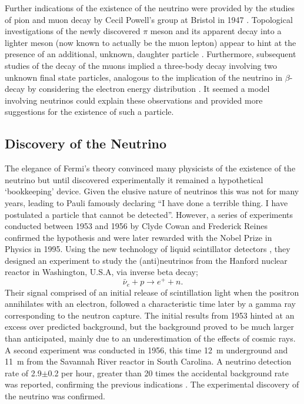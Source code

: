 Further indications of the existence of the neutrino were provided by the studies of pion and muon decay by Cecil Powell's group at Bristol in 1947 \cite{Lattes1947-159,Lattes1947-160}.  Topological investigations of the newly discovered $\pi$ meson and its apparent decay into a lighter meson (now known to actually be the muon lepton) appear to hint at the presence of an additional, unknown, daughter particle \cite{Lattes1947-159}.  Furthermore, subsequent studies of the decay of the muons implied a three-body decay involving two unknown final state particles, analogous to the implication of the neutrino in $\beta$-decay by considering the electron energy distribution \cite{Brown1949}.  It seemed a model involving neutrinos could explain these observations and provided more suggestions for the existence of such a particle.

\subsection{Discovery of the Neutrino}\label{NeutrinoDiscovery}

The elegance of Fermi's theory convinced many physicists of the existence of the neutrino but until discovered experimentally it remained a hypothetical `bookkeeping' device.  Given the elusive nature of neutrinos this was not for many years, leading to Pauli famously declaring ``I have done a terrible thing. I have postulated a particle that cannot be detected''.  However, a series of experiments conducted between 1953 and 1956 by Clyde Cowan and Frederick Reines confirmed the hypothesis and were later rewarded with the Nobel Prize in Physics in 1995.  Using the new technology of liquid scintillator detectors \cite{ReinesCowanLiquidScintillation}, they designed an experiment \cite{ReinesCowan1953Proposal} to study the (anti)neutrinos from the Hanford nuclear reactor in Washington, U.S.A, via inverse beta decay;
\begin{equation}\label{eq:InverseBetaDecay}
  {\bar{\nu}}_e + p \rightarrow e^+ + n.
\end{equation}
Their signal comprised of an initial release of scintillation light when the positron annihilates with an electron, followed a characteristic time later by a gamma ray corresponding to the neutron capture.  The initial results from 1953 \cite{ReinesCowan1953} hinted at an excess over predicted background, but the background proved to be much larger than anticipated, mainly due to an underestimation of the effects of cosmic rays.  A second experiment was conducted in 1956, this time 12~m underground and 11~m from the Savannah River reactor in South Carolina.  A neutrino detection rate of 2.9$\pm$0.2 per hour, greater than 20 times the accidental background rate was reported, confirming the previous indications \cite{ReinesCowan1956}.  The experimental discovery of the neutrino was confirmed.

